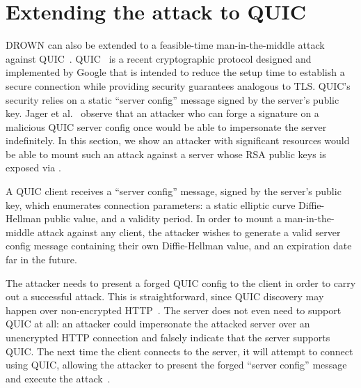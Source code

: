 

\section{Extending the attack to QUIC}
\label{sec:quic}

DROWN can also be extended to a feasible-time man-in-the-middle attack against QUIC~\cite{Jager:2015:STQ:2810103.2813657}.  QUIC~\cite{quic, langley2014quic} is a recent cryptographic protocol designed and implemented by Google that is intended to reduce the setup time to establish a secure connection while providing security guarantees analogous to TLS\@.  QUIC's security relies on a static ``server config'' message signed by the server's public key.  Jager et al.\@~\cite{Jager:2015:STQ:2810103.2813657} observe that an attacker who can forge a signature on a malicious QUIC server config once would be able to impersonate the server indefinitely.  In this section, we show an attacker with significant resources would be able to mount such an attack against a server whose RSA public keys is exposed via \ssltwo.

A QUIC client receives a ``server config'' message, signed by the server's public key, which enumerates connection parameters: a static elliptic curve Diffie-Hellman public value, and a validity period.  In order to mount a man-in-the-middle attack against any client, the attacker wishes to generate a valid server config message containing their own Diffie-Hellman value, and an expiration date far in the future.

The attacker needs to present a forged QUIC config to the client in order to carry out a successful attack.  This is straightforward, since QUIC discovery may happen over non-encrypted HTTP~\cite{QUICDiscovery}.  The server does not even need to support QUIC at all: an attacker could impersonate the attacked server over an unencrypted HTTP connection and falsely indicate that the server supports QUIC\@. The next time the client connects to the server, it will attempt to connect using QUIC, allowing the attacker to present the forged ``server config'' message and execute the attack~\cite{Jager:2015:STQ:2810103.2813657}.

